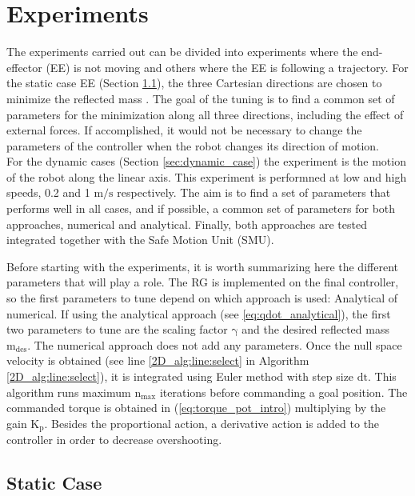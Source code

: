 \chapter{Experiments}
\label{ch:experiments}





The experiments carried out can be divided into experiments where the end-effector (EE) is not moving  and others where the EE is following a trajectory. 
For the static case EE (Section \ref{sec:static_case}), the three Cartesian directions are chosen to minimize the reflected mass . The goal of the tuning is to find a common set of parameters for the minimization along all three directions, including the effect of external forces. If accomplished, it would not be necessary to change the parameters of the controller when the robot changes its direction of motion.\\
%
For the dynamic cases (Section \ref{sec:dynamic_case}) the  experiment is the motion of the robot along the linear axis. This experiment is performned at low and high speeds, 0.2 and 1 $\mathrm{m/s}$ respectively. 
The aim is to find a set of parameters that performs well in all cases, and if possible, a common set of parameters for both approaches, numerical and analytical.
Finally, both approaches are tested integrated together with the Safe Motion Unit (SMU). 

Before starting with the experiments, it is worth summarizing here the different parameters that will play a role. 
The RG is implemented on the final controller, so the first parameters to tune depend on which approach is used: Analytical of numerical. If using the analytical approach (see \ref{eq:qdot_analytical}), the first two parameters to tune are the scaling factor $\mathrm{\gamma}$ and the desired reflected mass $\mathrm{m_{des}}$. The numerical approach does not add any parameters. Once the null space velocity is obtained (see line \ref{2D_alg:line:select} in Algorithm \ref{2D_alg:line:select}), it is integrated using Euler method with step size $\mathrm{dt}$. This algorithm runs maximum $\mathrm{n_{max}}$ iterations before commanding a goal position. The commanded torque is obtained in (\ref{eq:torque_pot_intro}) multiplying by the gain $\mathrm{K_p}$. Besides the proportional action, a derivative action is added to the controller in order to decrease overshooting.



\section{Static Case} 
\label{sec:static_case}







